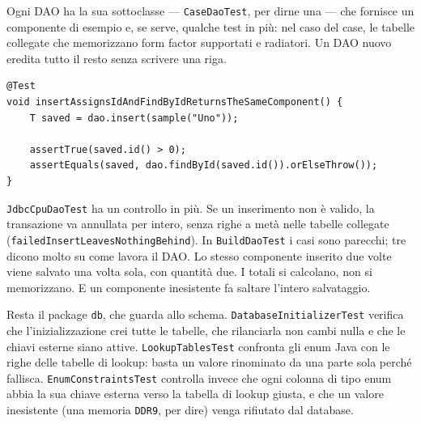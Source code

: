\documentclass[12pt,a4paper]{article}
\begin{document}
Ogni DAO ha la sua sottoclasse --- \texttt{CaseDaoTest}, per dirne una --- che fornisce un componente di
esempio e, se serve, qualche test in più: nel caso del case, le tabelle collegate che memorizzano form
factor supportati e radiatori. Un DAO nuovo eredita tutto il resto senza scrivere una riga.

\begin{lstlisting}[style=intellijlight, caption={Test comune a tutti i DAO in ComponentDaoContractTest}, label={lst:test-dao}]
@Test
void insertAssignsIdAndFindByIdReturnsTheSameComponent() {
    T saved = dao.insert(sample("Uno"));

    assertTrue(saved.id() > 0);
    assertEquals(saved, dao.findById(saved.id()).orElseThrow());
}
\end{lstlisting}

\texttt{JdbcCpuDaoTest} ha un controllo in più. Se un inserimento non è valido, la transazione va
annullata per intero, senza righe a metà nelle tabelle collegate (\texttt{failedInsertLeavesNothingBehind}).
In \texttt{BuildDaoTest} i casi sono parecchi; tre dicono molto su come lavora il DAO. Lo stesso
componente inserito due volte viene salvato una volta sola, con quantità due. I totali si calcolano, non
si memorizzano. E un componente inesistente fa saltare l'intero salvataggio.

Resta il package \texttt{db}, che guarda allo schema. \texttt{DatabaseInitializerTest} verifica che
l'inizializzazione crei tutte le tabelle, che rilanciarla non cambi nulla e che le chiavi esterne siano
attive. \texttt{LookupTablesTest} confronta gli enum Java con le righe delle tabelle di lookup: basta un
valore rinominato da una parte sola perché fallisca. \texttt{EnumConstraintsTest} controlla invece che ogni
colonna di tipo enum abbia la sua chiave esterna verso la tabella di lookup giusta, e che un valore
inesistente (una memoria \texttt{DDR9}, per dire) venga rifiutato dal database.
\end{document}
